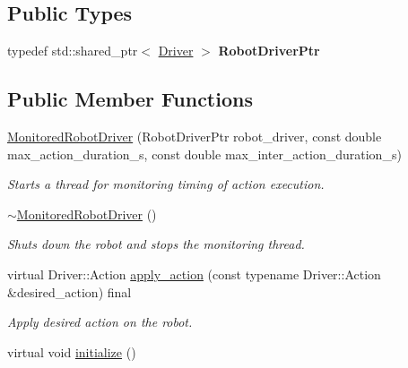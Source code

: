 \subsection*{Public Types}
\begin{DoxyCompactItemize}
\item 
\mbox{\label{classrobot__interfaces_1_1MonitoredRobotDriver_a272fbf2c9bf93f568c00dd1e37e62e97}} 
typedef std\+::shared\+\_\+ptr$<$ \hyperlink{classDriver}{Driver} $>$ {\bfseries Robot\+Driver\+Ptr}
\end{DoxyCompactItemize}
\subsection*{Public Member Functions}
\begin{DoxyCompactItemize}
\item 
\hyperlink{classrobot__interfaces_1_1MonitoredRobotDriver_a2ea1456e85ad7596295cb047e552dc06}{Monitored\+Robot\+Driver} (Robot\+Driver\+Ptr robot\+\_\+driver, const double max\+\_\+action\+\_\+duration\+\_\+s, const double max\+\_\+inter\+\_\+action\+\_\+duration\+\_\+s)
\begin{DoxyCompactList}\small\item\em Starts a thread for monitoring timing of action execution. \end{DoxyCompactList}\item 
\mbox{\label{classrobot__interfaces_1_1MonitoredRobotDriver_a07dfd2cc6f1dc07fad82914814a43188}} 
\hyperlink{classrobot__interfaces_1_1MonitoredRobotDriver_a07dfd2cc6f1dc07fad82914814a43188}{$\sim$\+Monitored\+Robot\+Driver} ()
\begin{DoxyCompactList}\small\item\em Shuts down the robot and stops the monitoring thread. \end{DoxyCompactList}\item 
virtual Driver\+::\+Action \hyperlink{classrobot__interfaces_1_1MonitoredRobotDriver_a3f0f7cbf74236e91d33dcfc08206b5e9}{apply\+\_\+action} (const typename Driver\+::\+Action \&desired\+\_\+action) final
\begin{DoxyCompactList}\small\item\em Apply desired action on the robot. \end{DoxyCompactList}\item 
virtual void \hyperlink{classrobot__interfaces_1_1MonitoredRobotDriver_a47b68c24afaa087e4e60e6413ab7ac89}{initialize} ()

\end{DoxyCompactItemize}
